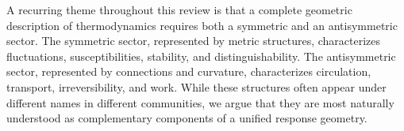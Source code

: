 A recurring theme throughout this review is that a complete geometric description of thermodynamics requires both a symmetric and an antisymmetric sector. The symmetric sector, represented by metric structures, characterizes fluctuations, susceptibilities, stability, and distinguishability. The antisymmetric sector, represented by connections and curvature, characterizes circulation, transport, irreversibility, and work. While these structures often appear under different names in different communities, we argue that they are most naturally understood as complementary components of a unified response geometry.


